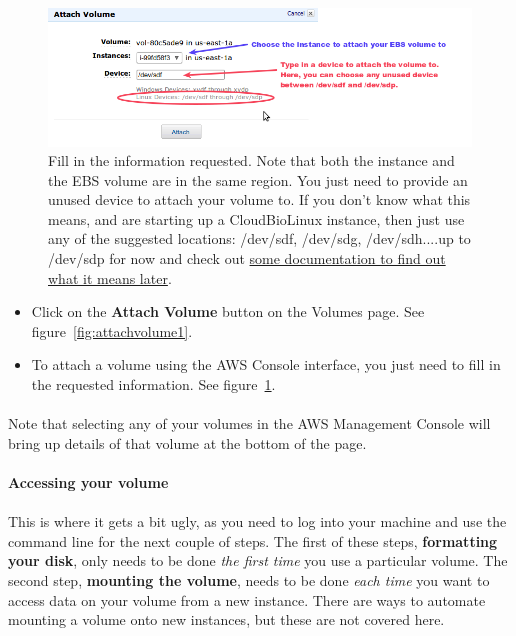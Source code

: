 \begin{figure}[!hd]
	\fbox
	{
		\begin{minipage}{13cm}
\includegraphics[width=\maxwidth]{"images/attachVolume-2"}
\caption[Attaching a volume]{\label{fig:attachvolume2}Fill in the information requested. Note that both the instance and the EBS volume are in the same region. You just need to provide an unused device to attach your volume to. If you don't know what this means, and are starting up a CloudBioLinux instance, then just use any of the suggested locations: /dev/sdf, /dev/sdg, /dev/sdh....up to /dev/sdp for now and check out \href{http://it.toolbox.com/wiki/index.php/Mount_point}{some documentation to find out what it means later}.}
		\end{minipage}
	}
\end{figure}


\begin{itemize}
\item Click on the \textbf{Attach Volume} button on the Volumes page. See figure~\ref{fig:attachvolume1}. 
\item To attach a volume using the AWS Console interface, you just need to fill in the requested information. See figure~\ref{fig:attachvolume2}.
\end{itemize}
\paragraph{}Note that selecting any of your volumes in the AWS Management Console will bring up details of that volume at the bottom of the page. 


\paragraph{Accessing your volume}
\paragraph{}\label{text:mounting}This is where it gets a bit ugly, as you need to log into your machine and use the command line for the next couple of steps. The first of these steps, \textbf{formatting your disk}, only needs to be done \emph{the first time} you use a particular volume. The second step, \textbf{mounting the volume}, needs to be done  \emph{each time} you want to access data on your volume from a new instance. There are ways to automate mounting a volume onto new instances, but these are not covered here. 

